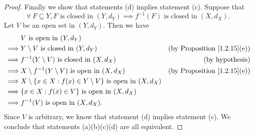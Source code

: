 \begin{proof}
    Finally we show that statements (d) implies statement (c).
    Suppose that
    \[
        \forall\ F \subseteq Y, F \text{ is closed in } (Y, d_Y) \implies f^{-1}(F) \text{ is closed in } (X, d_X).
    \]
    Let \(V\) be an open set in \((Y, d_Y)\).
    Then we have
    \begin{align*}
                 & V \text{ is open in } (Y, d_Y)                                                                                          \\
        \implies & Y \setminus V \text{ is closed in } (Y, d_Y)                                  & \text{(by Proposition \ref{1.2.15}(e))} \\
        \implies & f^{-1}(Y \setminus V) \text{ is closed in } (X, d_X)                          & \text{(by hypothesis)}                  \\
        \implies & X \setminus f^{-1}(Y \setminus V) \text{ is open in } (X, d_X)                & \text{(by Proposition \ref{1.2.15}(e))} \\
        \implies & X \setminus \{x \in X : f(x) \in Y \setminus V\} \text{ is open in } (X, d_X)                                           \\
        \implies & \{x \in X : f(x) \in V\} \text{ is open in } (X, d_X)                                                                   \\
        \implies & f^{-1}(V) \text{ is open in } (X, d_X).
    \end{align*}
    Since \(V\) is arbitrary, we know that statement (d) implies statement (c).
    We conclude that statements (a)(b)(c)(d) are all equivalent.
\end{proof}